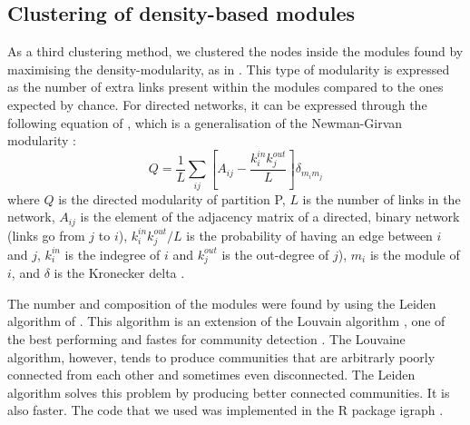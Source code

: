 \documentclass[twocolumn]{article}
\begin{document}
	\subsection*{Clustering of density-based modules}
		\par
		As a third clustering method, we clustered the nodes inside the modules found by maximising the density-modularity, as in \citet{Guimera2010}. This type of modularity is expressed as the number of extra links present within the modules compared to the ones expected by chance. For directed networks, it can be expressed through the following equation of \citet{Arenas2007}, which is a generalisation of the Newman-Girvan modularity \citep{Newman2004}:
			\begin{equation}
				Q=\frac{1}{L}\sum\limits_{ij}[A_{ij}-\frac{k_i^{in}k_j^{out}}{L}]\delta_{m_im_j} \label{eqn:modularitydensity}
			\end{equation}
		where $Q$ is the directed modularity of partition P, $L$ is the number of links in the network, $A_{ij}$ is the element of the adjacency matrix of a directed, binary network (links go from $j$ to $i$), $k_i^{in}k_j^{out}/L$ is the probability of having an edge between $i$ and $j$, $k^{in}_i$ is the indegree of $i$ and $k^{out}_j$ is the out-degree of $j$), $ m_i$ is the module of $i$, and $\delta$ is the Kronecker delta \citep{Kozen2007}.
		\par
		The number and composition of the modules were found by using the Leiden algorithm of \citet{Traag2019}. This algorithm is an extension of the Louvain algorithm \citep{Blondel2008}, one of the best performing and fastes for community detection \citep{Traag2019}. The Louvaine algorithm, however, tends to produce communities that are arbitrarly poorly connected from each other and sometimes even disconnected. The Leiden algorithm solves this problem by producing better connected communities. It is also faster. The code that we used was implemented in the R package igraph \citep{Csardi2006}.
\end{document}
